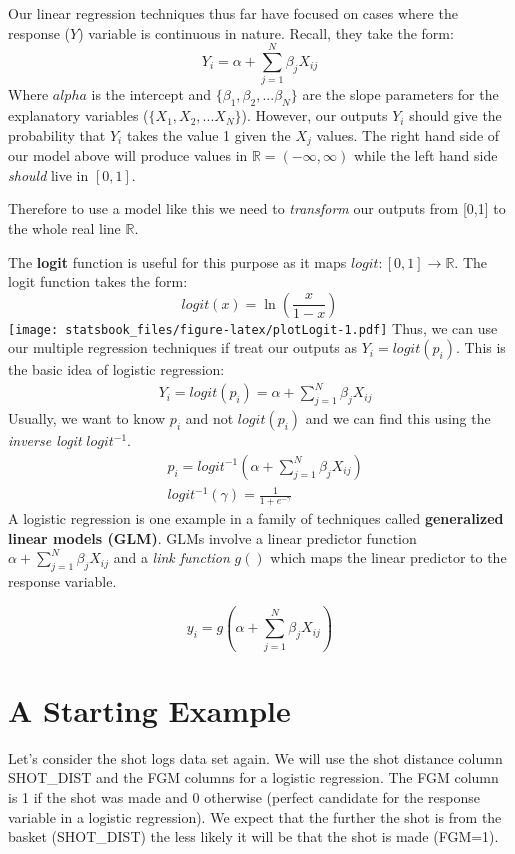 \documentclass[
]{book}
\theoremstyle{definition}
\theoremstyle{definition}
\theoremstyle{definition}
\theoremstyle{definition}
\theoremstyle{remark}
\begin{document}
Our linear regression techniques thus far have focused on cases where the response (\(Y\)) variable is continuous in nature. Recall, they take the form:
\[
Y_i=\alpha+ \sum_{j=1}^N \beta_j X_{ij}
\]
Where \(alpha\) is the intercept and \(\{\beta_1, \beta_2, ... \beta_N\}\) are the slope parameters for the explanatory variables (\(\{X_1, X_2, ...X_N\}\)). However, our outputs \(Y_i\) should give the probability that \(Y_i\) takes the value 1 given the \(X_j\) values. The right hand side of our model above will produce values in \(\mathbb{R}=(-\infty, \infty)\) while the left hand side \emph{should} live in \([0,1]\).

Therefore to use a model like this we need to \emph{transform} our outputs from {[}0,1{]} to the whole real line \(\mathbb{R}\).

The \textbf{logit} function is useful for this purpose as it maps \(logit: [0,1] \rightarrow \mathbb{R}\). The logit function takes the form:
\[logit(x)=\ln \left(\frac{x}{1-x}\right)\]
\texttt{[image: statsbook\_files/figure-latex/plotLogit-1.pdf]}
Thus, we can use our multiple regression techniques if treat our outputs as \(Y_i=logit(p_i)\). This is the basic idea of logistic regression:
\[
\begin{aligned}
& Y_i=logit(p_i)=\alpha+ \sum_{j=1}^N \beta_j X_{ij}
\end{aligned}
\]
Usually, we want to know \(p_i\) and not \(logit(p_i)\) and we can find this using the \emph{inverse logit} \(logit^{-1}\).
\[
\begin{aligned}
& p_i=logit^{-1} \left( \alpha+ \sum_{j=1}^N \beta_j X_{ij}   \right) \\
& logit^{-1}(\gamma)=\frac{1}{1+e^{-\gamma}}
\end{aligned}
\]
A logistic regression is one example in a family of techniques called \textbf{generalized linear models (GLM)}. GLMs involve a linear predictor function \(\alpha+ \sum_{j=1}^N \beta_j X_{ij}\) and a \emph{link function} \(g()\) which maps the linear predictor to the response variable.

\[y_i=g \left( \alpha+ \sum_{j=1}^N \beta_j X_{ij} \right)\]

\hypertarget{a-starting-example-1}{%
\section{A Starting Example}\label{a-starting-example-1}}

Let's consider the shot logs data set again. We will use the shot distance column SHOT\_DIST and the FGM columns for a logistic regression. The FGM column is 1 if the shot was made and 0 otherwise (perfect candidate for the response variable in a logistic regression). We expect that the further the shot is from the basket (SHOT\_DIST) the less likely it will be that the shot is made (FGM=1).
\end{document}
